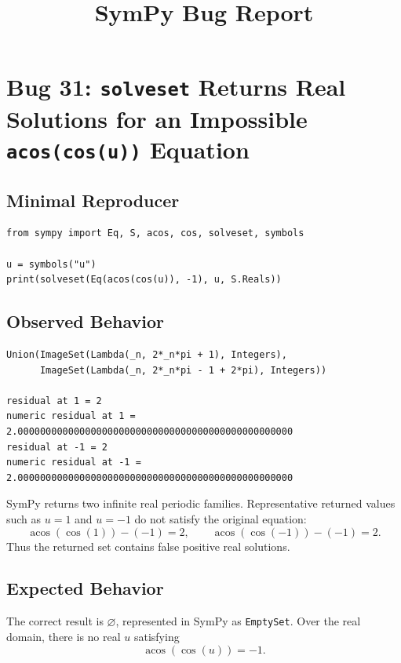 \documentclass[11pt]{article}
\title{SymPy Bug Report}
\date{}
\begin{document}
\author{}
\maketitle

\section{Bug 31: \texttt{solveset} Returns Real Solutions for an Impossible \texttt{acos(cos(u))} Equation}

\subsection{Minimal Reproducer}

\medskip

\begin{lstlisting}[style=bugpython]
from sympy import Eq, S, acos, cos, solveset, symbols

u = symbols("u")
print(solveset(Eq(acos(cos(u)), -1), u, S.Reals))
\end{lstlisting}

\subsection{Observed Behavior}

\medskip

\begin{lstlisting}[style=bugpython]
Union(ImageSet(Lambda(_n, 2*_n*pi + 1), Integers),
      ImageSet(Lambda(_n, 2*_n*pi - 1 + 2*pi), Integers))

residual at 1 = 2
numeric residual at 1 = 2.0000000000000000000000000000000000000000000000000
residual at -1 = 2
numeric residual at -1 = 2.0000000000000000000000000000000000000000000000000
\end{lstlisting}

SymPy returns two infinite real periodic families.  Representative returned
values such as \(u=1\) and \(u=-1\) do not satisfy the original equation:
\[
  \operatorname{acos}(\cos(1)) - (-1) = 2,
  \qquad
  \operatorname{acos}(\cos(-1)) - (-1) = 2.
\]
Thus the returned set contains false positive real solutions.

\subsection{Expected Behavior}

The correct result is \(\varnothing\), represented in SymPy as
\texttt{EmptySet}.  Over the real domain, there is no real \(u\) satisfying
\[
  \operatorname{acos}(\cos(u)) = -1.
\]
\end{document}
